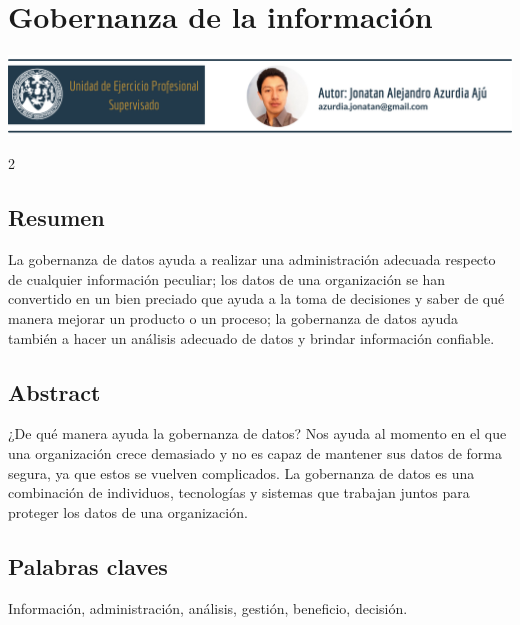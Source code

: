 \documentclass[12pt,spanish,Letterpaper,openany]{book}
\begin{document}
\hypertarget{cArzudia}{%
\chapter{Gobernanza de la información}\label{cArzudia}}

\begin{center}\includegraphics[width=1\linewidth]{images/jAzurdia_image1} \end{center}

\begin {multicols}{2}

\hypertarget{resumen-2}{%
\section{Resumen}\label{resumen-2}}

La gobernanza de datos ayuda a realizar una administración adecuada respecto de cualquier información peculiar; los datos de una organización se han convertido en un bien preciado que ayuda a la toma de decisiones y saber de qué manera mejorar un producto o un proceso; la gobernanza de datos ayuda también a hacer un análisis adecuado de datos y brindar información confiable.

\hypertarget{abstract-2}{%
\section{Abstract}\label{abstract-2}}

¿De qué manera ayuda la gobernanza de datos? Nos ayuda al momento en el que una organización crece demasiado y no es capaz de mantener sus datos de forma segura, ya que estos se vuelven complicados. La gobernanza de datos es una combinación de individuos, tecnologías y sistemas que trabajan juntos para proteger los datos de una organización.

\hypertarget{palabras-claves-2}{%
\section{Palabras claves}\label{palabras-claves-2}}

Información, administración, análisis, gestión, beneficio, decisión.

\hypertarget{introducciuxf3n-2}{%
}
\end{multicols}
\end{document}
